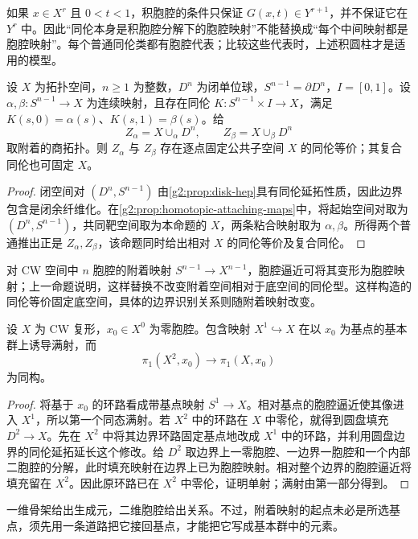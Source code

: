 如果 \(x\in X^r\) 且 \(0<t<1\)，积胞腔的条件只保证 \(G(x,t)\in Y^{r+1}\)，并不保证它在 \(Y^r\) 中。因此“同伦本身是积胞腔分解下的胞腔映射”不能替换成“每个中间映射都是胞腔映射”。每个普通同伦类都有胞腔代表；比较这些代表时，上述积圆柱才是适用的模型。

\begin{proposition}\label{g2:prop:homotopic-attaching}
	设 \(X\) 为拓扑空间，\(n\ge1\) 为整数，\(D^n\) 为闭单位球，\(S^{n-1}=\partial D^n\)，\(I=[0,1]\)。设 \(\alpha,\beta:S^{n-1}\to X\) 为连续映射，且存在同伦 \(K:S^{n-1}\times I\to X\)，满足 \(K(s,0)=\alpha(s)\)、\(K(s,1)=\beta(s)\)。给
	\[
		Z_\alpha=X\cup_\alpha D^n,\qquad Z_\beta=X\cup_\beta D^n
	\]
	取附着的商拓扑。则 \(Z_\alpha\) 与 \(Z_\beta\) 存在逐点固定公共子空间 \(X\) 的同伦等价；其复合同伦也可固定 \(X\)。
\end{proposition}
\begin{proof}
	闭空间对 \((D^n,S^{n-1})\) 由\cref{g2:prop:disk-hep}具有同伦延拓性质，因此边界包含是闭余纤维化。在\cref{g2:prop:homotopic-attaching-maps}中，将起始空间对取为 \((D^n,S^{n-1})\)，共同靶空间取为本命题的 \(X\)，两条粘合映射取为 \(\alpha,\beta\)。所得两个普通推出正是 \(Z_\alpha,Z_\beta\)，该命题同时给出相对 \(X\) 的同伦等价及复合同伦。
\end{proof}

对 CW 空间中 \(n\) 胞腔的附着映射 \(S^{n-1}\to X^{n-1}\)，胞腔逼近可将其变形为胞腔映射；上一命题说明，这样替换不改变附着空间相对于底空间的同伦型。这样构造的同伦等价固定底空间，具体的边界识别关系则随附着映射改变。

\begin{theorem}\label{g2:thm:pi1-two-skeleton}
	设 \(X\) 为 CW 复形，\(x_0\in X^0\) 为零胞腔。包含映射 \(X^1\hookrightarrow X\) 在以 \(x_0\) 为基点的基本群上诱导满射，而
	\[
		\pi_1(X^2,x_0)\longrightarrow\pi_1(X,x_0)
	\]
	为同构。
\end{theorem}
\begin{proof}
	将基于 \(x_0\) 的环路看成带基点映射 \(S^1\to X\)。相对基点的胞腔逼近使其像进入 \(X^1\)，所以第一个同态满射。若 \(X^2\) 中的环路在 \(X\) 中零伦，就得到圆盘填充 \(D^2\to X\)。先在 \(X^2\) 中将其边界环路固定基点地改成 \(X^1\) 中的环路，并利用圆盘边界的同伦延拓延长这个修改。给 \(D^2\) 取边界上一零胞腔、一边界一胞腔和一个内部二胞腔的分解，此时填充映射在边界上已为胞腔映射。相对整个边界的胞腔逼近将填充留在 \(X^2\)。因此原环路已在 \(X^2\) 中零伦，证明单射；满射由第一部分得到。
\end{proof}

一维骨架给出生成元，二维胞腔给出关系。不过，附着映射的起点未必是所选基点，须先用一条道路把它接回基点，才能把它写成基本群中的元素。

